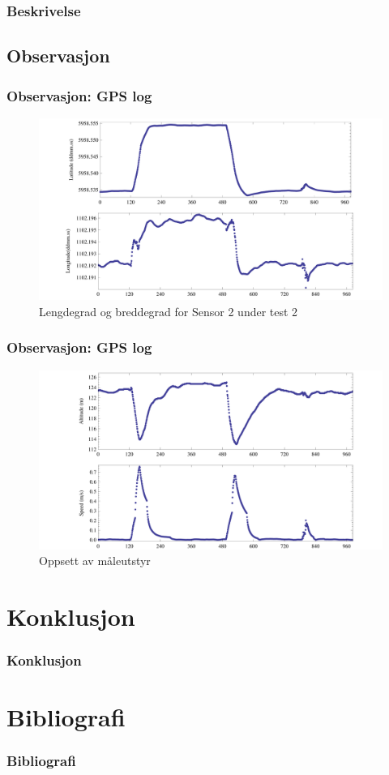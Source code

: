 \documentclass[xcolor=table]{beamer}
\begin{document}
\begin{frame}
\frametitle{Beskrivelse}
\end{frame}

\begin{frame}
\subsection{Observasjon}
\frametitle{Observasjon: GPS log}
        \begin{figure}
        \includegraphics[scale=0.25]{thesis/graphics/20161024-test2-sensor2-multipanel-1-1.png}
        \caption{Lengdegrad og breddegrad for Sensor 2 under test 2}
      \end{figure}
\end{frame}

\begin{frame}
\frametitle{Observasjon: GPS log}
        \begin{figure}
        \includegraphics[scale=0.25]{thesis/graphics/20161024-test2-sensor2-multipanel-1-2.png}
        \caption{Oppsett av måleutstyr}
      \end{figure}
\end{frame}



\section{Konklusjon}
\begin{frame}
  \frametitle{Konklusjon}
\end{frame}

\section{Bibliografi}
\begin{frame}[allowframebreaks]%
  \frametitle{Bibliografi}
  \printbibliography[heading=bibintoc]
\end{frame}
\end{document}
